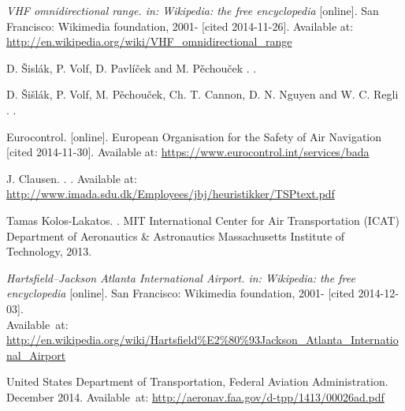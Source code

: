 \begin{thebibliography}{1}
{\em VHF omnidirectional range. in: Wikipedia: the free encyclopedia} [online].
\newblock San Francisco: Wikimedia foundation, 2001- [cited 2014-11-26].
\newblock Available at: \url{http://en.wikipedia.org/wiki/VHF_omnidirectional_range}

D. Šislák, P. Volf, D. Pavlíček and M. Pěchouček
.
.

D. Šišlák, P. Volf, M. Pěchouček, Ch. T. Cannon, D. N. Nguyen and W. C. Regli
.
.

Eurocontrol.
 [online].
\newblock European Organisation for the Safety of Air Navigation [cited 2014-11-30].
\newblock Available at: \url{https://www.eurocontrol.int/services/bada}

J. Clausen.
.
.
\newblock Available at: \url{http://www.imada.sdu.dk/Employees/jbj/heuristikker/TSPtext.pdf}

Tamas Kolos-Lakatos.
.
\newblock MIT International Center for Air Transportation (ICAT) Department of Aeronautics \& Astronautics Massachusetts Institute of Technology, 2013.

{\em Hartsfield–Jackson Atlanta International Airport. in: Wikipedia: the free encyclopedia} [online].
\newblock San Francisco: Wikimedia foundation, 2001- [cited 2014-12-03]. \\
\newblock Available~at: \url{http://en.wikipedia.org/wiki/Hartsfield\%E2\%80\%93Jackson_Atlanta_International_Airport}

United States Department of Transportation, Federal Aviation Administration.
 December 2014.
\newblock Available~at: \url{http://aeronav.faa.gov/d-tpp/1413/00026ad.pdf}

\end{thebibliography}
